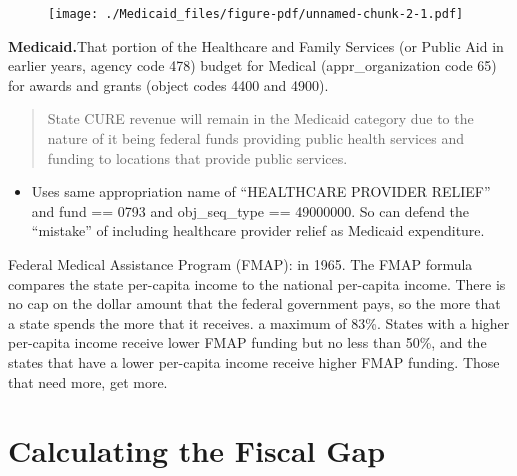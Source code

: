 \documentclass[
  letterpaper,
  DIV=11,
  numbers=noendperiod]{scrreport}
\providecommand{\tightlist}{%
  \setlength{\itemsep}{0pt}\setlength{\parskip}{0pt}}\usepackage{longtable,booktabs,array}
\begin{document}
\begin{figure}[H]

{\centering \texttt{[image: ./Medicaid\_files/figure-pdf/unnamed-chunk-2-1.pdf]}

}

\end{figure}

\textbf{Medicaid.}That portion of the Healthcare and Family Services (or
Public Aid in earlier years, agency code 478) budget for Medical
(appr\_organization code 65) for awards and grants (object codes 4400
and 4900).

\begin{quote}
State CURE revenue will remain in the Medicaid category due to the
nature of it being federal funds providing public health services and
funding to locations that provide public services.
\end{quote}

\begin{itemize}
\tightlist
\item
  Uses same appropriation name of ``HEALTHCARE PROVIDER RELIEF'' and
  fund == 0793 and obj\_seq\_type == 49000000. So can defend the
  ``mistake'' of including healthcare provider relief as Medicaid
  expenditure.
\end{itemize}

Federal Medical Assistance Program (FMAP): in 1965. The FMAP formula
compares the state per-capita income to the national per-capita income.
There is no cap on the dollar amount that the federal government pays,
so the more that a state spends the more that it receives. a maximum of
83\%. States with a higher per-capita income receive lower FMAP funding
but no less than 50\%, and the states that have a lower per-capita
income receive higher FMAP funding. Those that need more, get more.


\hypertarget{calculating-the-fiscal-gap}{%
\chapter{Calculating the Fiscal Gap}\label{calculating-the-fiscal-gap}}
\end{document}

